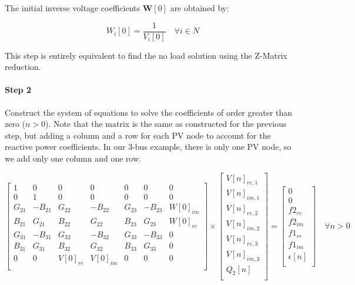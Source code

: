 \documentclass[a4paper,twoside,fleqn]{tufte-book}
\begin{document}
The initial inverse voltage coefficients $\textbf{W}[0]$ are obtained by:

\begin{equation}
W_i[0] = \frac{1}{V_i[0]}  \quad \forall i \in N
\end{equation}

This step is entirely equivalent to find the no load solution using the Z-Matrix reduction.

\paragraph{Step 2}

Construct the system of equations to solve the coefficients of order greater than zero ($n>0$). Note that the matrix is the same as constructed for the previous step, but adding a column and a row for each PV node to account for the reactive power coefficients. In our 3-bus example, there is only one PV node, so we add only one column and one row.

\begin{equation}
\begin{bmatrix}
1 & 0 & 0 & 0 & 0 & 0 & 0\\
0 & 1 & 0 & 0 & 0 & 0 & 0\\
G_{21} & -B_{21} & G_{22} & -B_{22} & G_{23} & -B_{23} & W[0]_{im}\\
B_{21} & G_{21}  & B_{22} & G_{22}  & B_{23} & G_{23} & W[0]_{re}\\
G_{31} & -B_{31} & G_{32} & -B_{32} & G_{33} & -B_{33} & 0\\
B_{31} & G_{31}  & B_{32} & G_{32}  & B_{33} & G_{33} & 0\\
0 & 0 & V[0]_{re} & V[0]_{im} & 0 & 0 & 0\\
\end{bmatrix}
\times
\begin{bmatrix}
V[n]_{re, 1}\\
V[n]_{im, 1}\\
V[n]_{re, 2}\\
V[n]_{im, 2}\\
V[n]_{re, 3}\\
V[n]_{im, 3}\\
Q_2[n]\\
\end{bmatrix}
=
\begin{bmatrix}
0\\
0\\
f2_{re}\\
f2_{im}\\
f1_{re}\\
f1_{im}\\
\epsilon[n]\\
\end{bmatrix}
\quad \forall n > 0
\label{lin_sys_2}
\end{equation}
\end{document}
